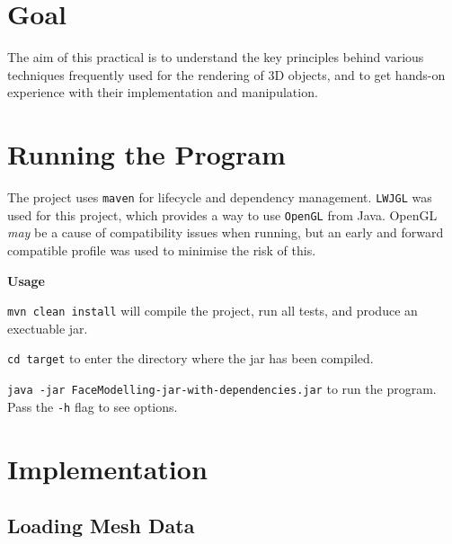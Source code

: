 \documentclass[12pt]{article}
\begin{document}
\begin{titlepage}

\vfill %

\end{titlepage}

\section*{Goal}

The aim of this practical is to understand the key principles behind various techniques
frequently used for the rendering of 3D objects, and to get hands-on experience with their implementation and manipulation.

\setcounter{page}{1} 

\section{Running the Program}

The project uses \texttt{maven} for lifecycle and dependency management.
\texttt{LWJGL} was used for this project, which provides a way to use \texttt{OpenGL} from Java. 
OpenGL \textit{may} be a cause of compatibility issues when running, but an early and forward compatible profile was used to minimise the risk of this.

\bigskip
\noindent\textbf{Usage} 

\noindent\texttt{mvn clean install} will compile the project, run all tests, and produce an exectuable jar.

\noindent\texttt{cd target} to enter the directory where the jar has been compiled.

\noindent \texttt{java -jar FaceModelling-jar-with-dependencies.jar} to run the program. Pass the \texttt{-h} flag to see options.

\section{Implementation}

\subsection{Loading Mesh Data}
\end{document}
